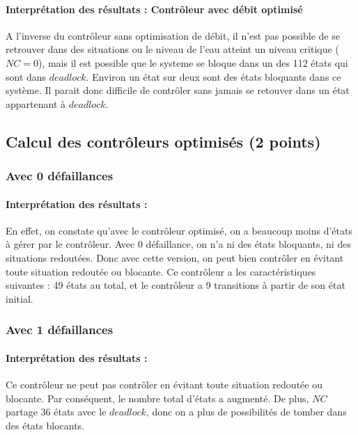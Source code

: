 \documentclass[a4paper]{book}
\begin{document}
\paragraph{Interprétation des résultats : Contrôleur avec débit optimisé}
A l'inverse du contrôleur sans optimisation de débit, il n'est pas possible de se retrouver dans des situations ou le niveau de l'eau atteint un niveau critique ($NC = 0$), mais il est possible que le systeme se bloque dans un des 112 états qui sont dans $deadlock$.
Environ un état sur deux sont des états bloquants dans ce système. Il parait donc difficile de contrôler sans jamais se retouver dans un état appartenant à $deadlock$.

\subsection{Calcul des contrôleurs optimisés (2 points)}

\subsubsection{Avec 0 défaillances}

\paragraph{Interprétation des résultats : }
En effet, on constate qu'avec le contrôleur optimisé, on a beaucoup moins d'états à gérer par le contrôleur.
Avec $0$ défaillance, on n'a ni des états bloquants, ni des situations redoutées. Donc avec cette version, on peut bien contrôler en évitant toute situation redoutée ou blocante.
Ce contrôleur a les caractéristiques suivantes :
$49$ états au total, et le contrôleur a 9 transitions à partir de son état initial.

\subsubsection{Avec 1 défaillances}

\paragraph{Interprétation des résultats : }
Ce contrôleur ne peut pas contrôler en évitant toute situation redoutée ou blocante.
Par conséquent, le nombre total d'états a augmenté. De plus, $NC$ partage 36 états avec le $deadlock$, donc on a plus de possibilités de tomber dans des états blocants.
\end{document}
